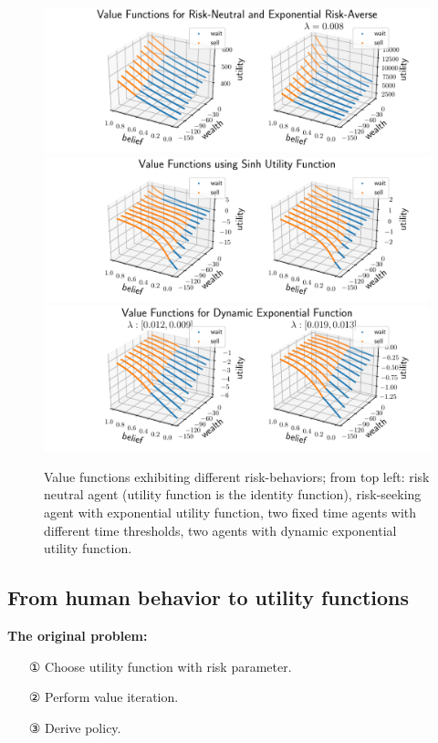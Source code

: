 \begin{figure}
    \includegraphics[width=0.98\linewidth]{img/exp_policy.pdf}\\
    \vspace{1cm}
    \includegraphics[width=0.98\linewidth]{img/sinh_policy.pdf}\\
    \vspace{1cm}
    \includegraphics[width=0.98\linewidth]{img/dyn_policy.pdf}
    \caption{Value functions exhibiting different risk-behaviors; from top left: risk neutral agent (utility function is the identity function), risk-seeking agent with exponential utility function, two fixed time agents with different time thresholds, two agents with dynamic exponential utility function.}
\end{figure}

\subsection{From human behavior to utility functions}


\normalsize
\textbf{The original problem:}
\begin{itemize}
\item[①] Choose utility function with risk parameter.
\item[②] Perform value iteration.
\item[③] Derive policy.
\end{itemize}

